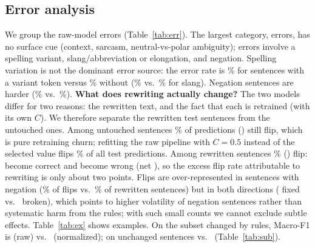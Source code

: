 \documentclass[10pt,twocolumn,letterpaper]{article}
\begin{document}
\subsection{Error analysis}\label{sec:err}
\begin{table}[t]\centering\footnotesize\setlength{\tabcolsep}{4pt}

\caption{Primary category of raw-model test errors (priority: spelling $>$ slang $>$ negation $>$ other).}\label{tab:err}
\end{table}
\begin{table}[t]\centering\footnotesize\setlength{\tabcolsep}{4pt}

\caption{Macro-F1 on test subsets (categories overlap).}\label{tab:sub}
\end{table}
We group the \ErrRaw{} raw-model errors (Table~\ref{tab:err}). The largest category, \CatOther{} errors, has no surface cue (context, sarcasm, neutral-vs-polar ambiguity); \CatSpell{} errors involve a spelling variant, \CatSlang{} slang/abbreviation or elongation, and \CatNeg{} negation. Spelling variation is not the dominant error source: the error rate is \ErrSpellWith\% for sentences with a variant token versus \ErrSpellWithout\% without (\ErrSlangWith\% vs.\ \ErrSlangWithout\% for slang). Negation sentences are harder (\ErrNegWith\% vs.\ \ErrNegWithout\%). \textbf{What does rewriting actually change?} The two models differ for two reasons: the rewritten text, and the fact that each is retrained (with its own $C$). We therefore separate the \ChangedTest{} rewritten test sentences from the \UnchN{} untouched ones. Among untouched sentences \FlipUnchPct\% of predictions (\FlipsUnch) still flip, which is pure retraining churn; refitting the raw pipeline with $C{=}0.5$ instead of the selected value flips \ChurnRefPct\% of all test predictions. Among rewritten sentences \FlipChgPct\% (\FlipsChg) flip: \FixedChg{} become correct and \BrokenChg{} become wrong (net \NetChg), so the excess flip rate attributable to rewriting is only about two points. Flips are over-represented in sentences with negation (\FlipNegShare\% of flips vs.\ \NegChgShare\% of rewritten sentences) but in both directions (\FixedChgNeg{} fixed vs.\ \BrokenChgNeg{} broken), which points to higher volatility of negation sentences rather than systematic harm from the rules; with such small counts we cannot exclude subtle effects. Table~\ref{tab:ex} shows examples. On the subset changed by rules, Macro-F1 is \SubChgRaw{} (raw) vs.\ \SubChgNorm{} (normalized); on unchanged sentences \SubUnchRaw{} vs.\ \SubUnchNorm{} (Table~\ref{tab:sub}).
\begin{table}[t]\centering\footnotesize\setlength{\tabcolsep}{3pt}

\caption{Test sentences whose prediction changed after rewriting (excerpts; offensive items omitted; @u = user mention).}\label{tab:ex}
\end{table}
\end{document}
